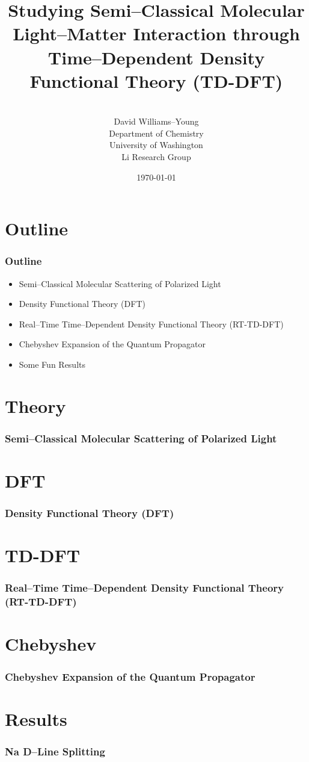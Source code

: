 \documentclass{beamer}
\title[]{Studying Semi--Classical Molecular Light--Matter Interaction through
Time--Dependent Density Functional Theory (TD-DFT)}
\author[Li Research Group, University of Washington]{
\\[1\baselineskip]
David Williams--Young \\
Department of Chemistry \\
University of Washington \\
Li Research Group
}
\date{\today}
\begin{document}
\begin{frame}
\titlepage
\end{frame}


\section{Outline}


\begin{frame}
\frametitle{Outline}

\begin{itemize}
  \item Semi--Classical Molecular Scattering of Polarized Light
  \item Density Functional Theory (DFT)
  \item Real--Time Time--Dependent Density Functional Theory (RT-TD-DFT)
  \item Chebyshev Expansion of the Quantum Propagator
  \item Some Fun Results
\end{itemize}
\end{frame}

\section{Theory}

\begin{frame}
\frametitle{Semi--Classical Molecular Scattering of Polarized Light}
\end{frame}


\section{DFT}

\begin{frame}
\frametitle{Density Functional Theory (DFT)}
\end{frame}

\section{TD-DFT}

\begin{frame}
\frametitle{Real--Time Time--Dependent Density Functional Theory (RT-TD-DFT)}
\end{frame}

\section{Chebyshev}

\begin{frame}
\frametitle{Chebyshev Expansion of the Quantum Propagator}
\end{frame}

\section{Results}

\begin{frame}
\frametitle{Na D--Line Splitting}
\end{frame}
\end{document}
